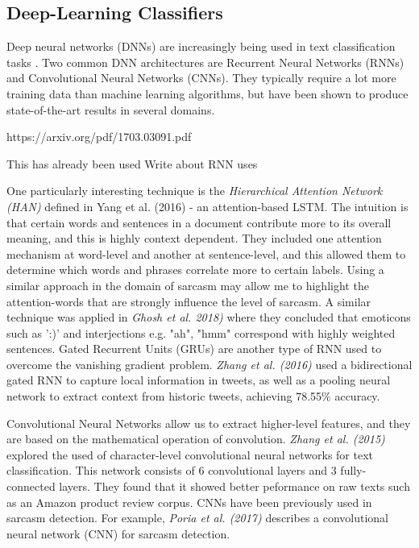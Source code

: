\documentclass[12pt,a4paper]{article}
\begin{document}
\subsection{Deep-Learning Classifiers}
Deep neural networks (DNNs) are increasingly being used in text classification tasks \cite{zhang2015character, poria2016deeper}. Two common DNN architectures are Recurrent Neural Networks (RNNs) and Convolutional Neural Networks (CNNs). They typically require a lot more training data than machine learning algorithms, but have been shown to produce state-of-the-art results in several domains.

https://arxiv.org/pdf/1703.03091.pdf

This has already been used
Write about RNN uses

One particularly interesting technique is the \textit{Hierarchical Attention Network (HAN)} defined in Yang et al. (2016) \cite{yang2016hierarchical} - an attention-based LSTM. The intuition is that certain words and sentences in a document contribute more to its overall meaning, and this is highly context dependent. They included one attention mechanism at word-level and another at sentence-level, and this allowed them to determine which words and phrases correlate more to certain labels. Using a similar approach in the domain of sarcasm may allow me to highlight the attention-words that are strongly influence the level of sarcasm. A similar technique was applied in \textit{Ghosh et al. 2018)} \cite{ghosh2018sarcasm} where they concluded that emoticons such as ':)' and interjections e.g. "ah", "hmm" correspond with highly weighted sentences. 
Gated Recurrent Units (GRUs) are another type of RNN used to overcome the vanishing gradient problem.  \textit{Zhang et al. (2016)} \cite{zhang2016tweet} used a bidirectional gated RNN to capture local information in tweets, as well as a pooling neural network to extract context from historic tweets, achieving 78.55\% accuracy.

Convolutional Neural Networks allow us to extract higher-level features, and they are based on the mathematical operation of convolution. \textit{Zhang et al. (2015)}  \cite{zhang2015character} explored the used of character-level convolutional neural networks for text classification. This network consists of 6 convolutional layers and 3 fully-connected layers. They found that it showed better peformance on raw texts such as an Amazon product review corpus. CNNs have been previously used in sarcasm detection. For example, \textit{Poria et al. (2017)} \cite{poria2016deeper} describes a convolutional neural network (CNN) for sarcasm detection. \\
\end{document}
